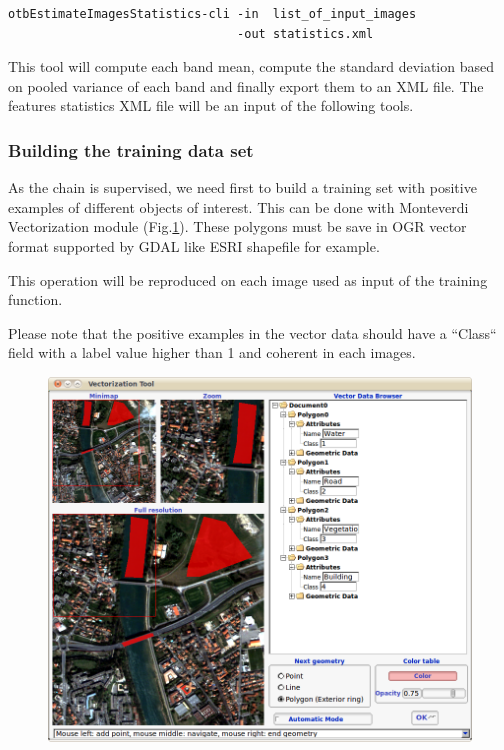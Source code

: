 \begin{verbatim}
otbEstimateImagesStatistics-cli -in  list_of_input_images 
                                -out statistics.xml
\end{verbatim}

This tool will compute each band mean, compute the standard deviation based on pooled variance of each band and finally export them to an XML file.
The features statistics XML file will be an input of the following tools. 

\subsubsection{Building the training data set}

As the chain is supervised, we need first to build a training set with
positive examples of different objects of interest. This can be done
with Monteverdi Vectorization module
(Fig.\ref{fig:vectoModuleDataSetCreation}). 
These polygons must be save in OGR vector format supported
by GDAL like ESRI shapefile for example.

This operation will be reproduced on each image used as input of the training function.

Please note that the positive examples in the vector data should have a ``Class`` field with a label value higher than 1 and coherent in each images. 

\begin{figure}
  \center
  \includegraphics[width=1\textwidth]{../Art/MonteverdiImages/monteverdi_vectorization_module_for_classification.png}
  \label{fig:vectoModuleDataSetCreation}
\end{figure}

